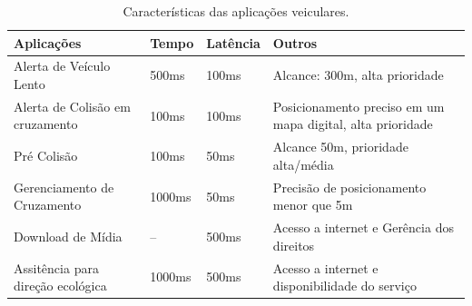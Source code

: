 \documentclass[
	12pt,				%
	oneside,			%
	a4paper,			%
	english,			%
	brazil				%
	]{abntex2ppgsi}
\begin{document}
\begin{table}[!h]
	\centering
	\caption{Características das aplicações veiculares.} 
	\label{tab:caracteristiasAppVanet}
	\begin{tabular}{|p{5cm}|p{1.5cm}|p{1.7cm}|p{4.0cm}|}
		\hline
		\rowcolor[gray]{0.7}
		Aplicações	& Tempo & Latência & Outros \\ \hline
		Alerta de Veículo Lento	&  500ms & 100ms & Alcance: 300m, alta prioridade \\ \hline
		
		Alerta de Colisão em cruzamento	 & 100ms & 100ms & Posicionamento preciso em um mapa digital, alta prioridade \\ \hline		
		
		Pré Colisão	&  100ms & 50ms & Alcance 50m, prioridade alta/média \\ \hline				
		Gerenciamento de Cruzamento	&  1000ms & 50ms & Precisão de posicionamento menor que  5m \\ \hline				
		Download de Mídia	& -- & 500ms & Acesso a internet e Gerência dos direitos \\ \hline						
		Assitência para direção ecológica	&  1000ms & 500ms & Acesso a internet e disponibilidade do serviço \\ \hline								
	\end{tabular}
\end{table}

		
\end{document}
